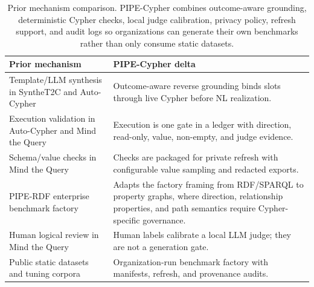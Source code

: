 \begin{table}[H]
\centering
\footnotesize
\begin{tabular}{@{}p{}p{}@{}}
\toprule
Prior mechanism & PIPE-Cypher delta \\
\midrule
Template/LLM synthesis in SyntheT2C and Auto-Cypher & Outcome-aware reverse grounding binds slots through live Cypher before NL realization. \\
Execution validation in Auto-Cypher and Mind the Query & Execution is one gate in a ledger with direction, read-only, value, non-empty, and judge evidence. \\
Schema/value checks in Mind the Query & Checks are packaged for private refresh with configurable value sampling and redacted exports. \\
PIPE-RDF enterprise benchmark factory~\citep{ranganath2026piperd} & Adapts the factory framing from RDF/SPARQL to property graphs, where direction, relationship properties, and path semantics require Cypher-specific governance. \\
Human logical review in Mind the Query & Human labels calibrate a local LLM judge; they are not a generation gate. \\
Public static datasets and tuning corpora & Organization-run benchmark factory with manifests, refresh, and provenance audits. \\
\bottomrule
\end{tabular}
\caption{Prior mechanism comparison. PIPE-Cypher combines outcome-aware grounding, deterministic Cypher checks, local judge calibration, privacy policy, refresh support, and audit logs so organizations can generate their own benchmarks rather than only consume static datasets.}
\label{tab:prior_mechanism_comparison}
\end{table}
